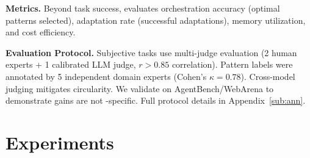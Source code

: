 \documentclass{article}
\theoremstyle{plain}
\theoremstyle{definition}
\theoremstyle{remark}
\begin{document}
\textbf{Metrics.} Beyond task success, \mars{} evaluates orchestration accuracy (optimal patterns selected), adaptation rate (successful adaptations), memory utilization, and cost efficiency.

\textbf{Evaluation Protocol.} Subjective tasks use multi-judge evaluation (2 human experts + 1 calibrated LLM judge, $r > 0.85$ correlation). Pattern labels were annotated by 5 independent domain experts (Cohen's $\kappa = 0.78$). Cross-model judging mitigates circularity. We validate on AgentBench/WebArena to demonstrate gains are not \mars{}-specific. Full protocol details in Appendix~\ref{sub:ann}.

\section{Experiments}
\label{sec:experiments}
\end{document}
